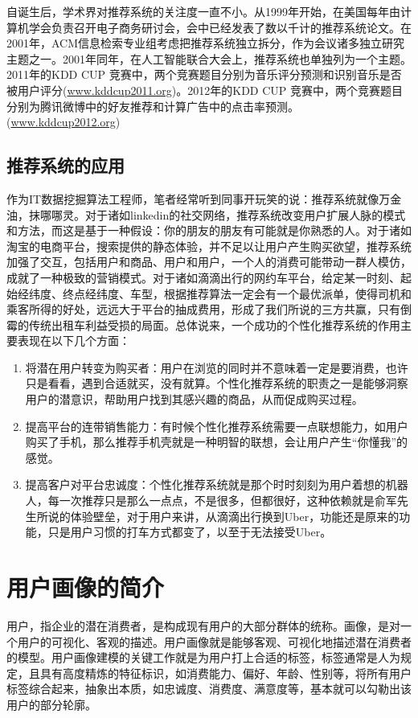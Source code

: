 	自诞生后，学术界对推荐系统的关注度一直不小。从1999年开始，在美国每年由计算机学会负责召开电子商务研讨会，会中已经发表了数以千计的推荐系统论文。在2001年，ACM信息检索专业组考虑把推荐系统独立拆分，作为会议诸多独立研究主题之一。2001年同年，在人工智能联合大会上，推荐系统也单独列为一个主题。2011年的KDD CUP 竞赛中，两个竞赛题目分别为音乐评分预测和识别音乐是否被用户评分(\href{http://www.kdd.org/kdd2011/kddcup.shtml}{www.kddcup2011.org})。2012年的KDD CUP 竞赛中，两个竞赛题目分别为腾讯微博中的好友推荐和计算广告中的点击率预测。(\href{www.kddcup2012.org}{www.kddcup2012.org})

	\subsection{推荐系统的应用}
	作为IT数据挖掘算法工程师，笔者经常听到同事开玩笑的说：推荐系统就像万金油，抹哪哪灵。对于诸如linkedin的社交网络，推荐系统改变用户扩展人脉的模式和方法，而这是基于一种假设：你的朋友的朋友有可能就是你熟悉的人。对于诸如淘宝的电商平台，搜索提供的静态体验，并不足以让用户产生购买欲望，推荐系统加强了交互，包括用户和商品、用户和用户，一个人的消费可能带动一群人模仿，成就了一种极致的营销模式。对于诸如滴滴出行的网约车平台，给定某一时刻、起始经纬度、终点经纬度、车型，根据推荐算法一定会有一个最优派单，使得司机和乘客所得的好处，远远大于平台的抽成费用，形成了我们所说的三方共赢，只有倒霉的传统出租车利益受损的局面。总体说来，一个成功的个性化推荐系统的作用主要表现在以下几个方面：
	\begin{enumerate}[(1)]
	\item 将潜在用户转变为购买者：用户在浏览的同时并不意味着一定是要消费，也许只是看看，遇到合适就买，没有就算。个性化推荐系统的职责之一是能够洞察用户的潜意识，帮助用户找到其感兴趣的商品，从而促成购买过程。
	\item 提高平台的连带销售能力：有时候个性化推荐系统需要一点联想能力，如用户购买了手机，那么推荐手机壳就是一种明智的联想，会让用户产生“你懂我”的感觉。
	\item 提高客户对平台忠诚度：个性化推荐系统就是那个时时刻刻为用户着想的机器人，每一次推荐只是那么一点点，不是很多，但都很好，这种依赖就是俞军先生所说的体验壁垒，对于用户来讲，从滴滴出行换到Uber，功能还是原来的功能，只是用户习惯的打车方式都变了，以至于无法接受Uber。
	\end{enumerate}

\section{用户画像的简介}
	用户，指企业的潜在消费者，是构成现有用户的大部分群体的统称。画像，是对一个用户的可视化、客观的描述。用户画像就是能够客观、可视化地描述潜在消费者的模型。用户画像建模的关键工作就是为用户打上合适的标签，标签通常是人为规定，且具有高度精炼的特征标识，如消费能力、偏好、年龄、性别等，将所有用户标签综合起来，抽象出本质，如忠诚度、消费度、满意度等，基本就可以勾勒出该用户的部分轮廓。
